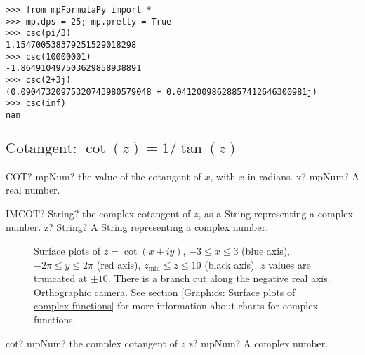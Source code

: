\begin{lstlisting}
>>> from mpFormulaPy import *
>>> mp.dps = 25; mp.pretty = True
>>> csc(pi/3)
1.154700538379251529018298
>>> csc(10000001)
-1.864910497503629858938891
>>> csc(2+3j)
(0.09047320975320743980579048 + 0.04120098628857412646300981j)
>>> csc(inf)
nan
\end{lstlisting}



\newpage
\subsection{\texorpdfstring{$\text{Cotangent: }\cot(z) = 1/\tan(z)$}{cot}}

\begin{mpFunctionsExtract}
	\mpWorksheetFunctionOneNotImplemented
	{COT? mpNum? the value of the cotangent of $x$, with $x$ in radians.}
	{x? mpNum? A real number.}
\end{mpFunctionsExtract}

\vspace{0.6cm}
\begin{mpFunctionsExtract}
	\mpWorksheetFunctionOneNotImplemented
	{IMCOT? String? the complex cotangent of $z$, as a String representing a complex number.}
	{z? String? A String representing a complex number.}
\end{mpFunctionsExtract}


\begin{figure}[ht]%
	\centering
	\qquad
	\caption[Complex Cotangent]{Surface plots of $z = \cot(x + iy)$, $-3 \leq x \leq 3$ (blue axis), $-2 \pi \leq y \leq 2\pi$ (red axis), $z_{\text{min}} \leq z \leq 10$ (black axis). $z$ values are truncated at $\pm 10$. There is a branch cut along the negative real axis. Orthographic camera. See section \ref{Graphics: Surface plots of complex functions} for more information about charts for complex functions.} 
	\label{fig:Complex Cotangent}%
\end{figure}

\begin{mpFunctionsExtract}
	\mpFunctionOne
	{cot? mpNum? the complex cotangent of $z$}
	{z? mpNum? A complex number.}
\end{mpFunctionsExtract}

